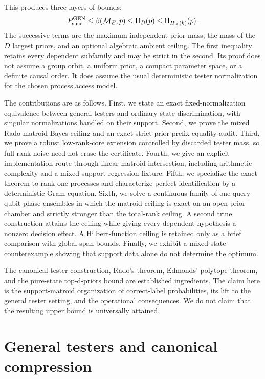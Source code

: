 \documentclass[11pt]{article}
\theoremstyle{definition}
\theoremstyle{remark}
\newcommand{\cM}{\mathcal M}
\begin{document}
This produces three layers of bounds:
\[
 P_{\rm succ}^{\rm GEN}\leq\beta(\cM_E,p)
 \leq\Pi_D(p)\leq\Pi_{H_X(k)}(p).
\]
The successive terms are the maximum independent prior mass, the mass of the
$D$ largest priors, and an optional algebraic ambient ceiling.
The first inequality retains every dependent subfamily and may be strict in
the second.  Its proof does not assume a group orbit, a uniform prior, a
compact parameter space, or a definite causal order.  It does assume the
usual deterministic tester normalization for the chosen process access model.

The contributions are as follows.  First, we state an exact fixed-normalization
equivalence between general testers and ordinary state discrimination, with
singular normalizations handled on their support.  Second, we prove the mixed
Rado-matroid Bayes ceiling and an exact strict-prior-prefix equality audit.
Third, we prove a robust low-rank-core extension controlled by discarded
tester mass, so full-rank noise need not erase the certificate.  Fourth, we
give an explicit implementation route through linear matroid intersection,
including arithmetic complexity and a mixed-support regression fixture.
Fifth, we specialize the exact theorem to rank-one processes and characterize
perfect identification by a deterministic Gram equation.  Sixth, we solve a
continuous family of one-query qubit phase ensembles in which the matroid
ceiling is exact on an open prior chamber and strictly stronger than the
total-rank ceiling.  A second trine construction attains the ceiling while
giving every dependent hypothesis a nonzero decision effect.  A
Hilbert-function ceiling is retained only as a brief
comparison with global span bounds.  Finally, we exhibit a mixed-state
counterexample showing that support data alone do not determine the optimum.

The canonical tester construction, Rado's theorem, Edmonds' polytope theorem,
and the pure-state top-d-priors bound are established ingredients.  The claim
here is the support-matroid organization of correct-label probabilities, its
lift to the general tester setting, and the operational consequences.  We do
not claim that the resulting upper bound is universally attained.

\section{General testers and canonical compression}
\end{document}
